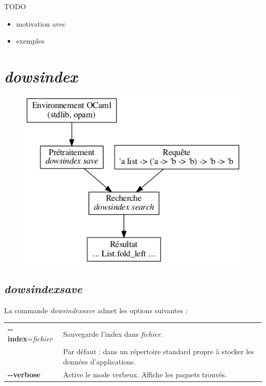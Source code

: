 \documentclass [a4paper] {report}
\theoremstyle {definition}
\newcommand {\dowsindex} {\textit{dowsindex}\xspace}
\begin{document}
TODO
\begin {itemize}
	\item motivation avec \cite {schulz}
	\item exemples
\end {itemize}


\chapter {\dowsindex}

\begin {figure} [h]
\begin {center}
	\includegraphics [scale=0.35] {graphs/dowsindex}
\end {center}
\end {figure}

\section {\dowsindex \textit {save}}

La commande \dowsindex \textit {save} admet les options suivantes :

\begin {table} [h]
\begin {tabular} {ll}
		\textbf{-{}-index}=\textit{fichier} &
		Sauvegarde l'index dans \textit {fichier}. \\ &
		Par défaut : dans un répertoire standard propre à stocker les données d'applications.
	\\
		\textbf {-{}-verbose} &
		Active le mode verbeux. Affiche les paquets trouvés.
\end {tabular}
\end {table}
\end{document}
